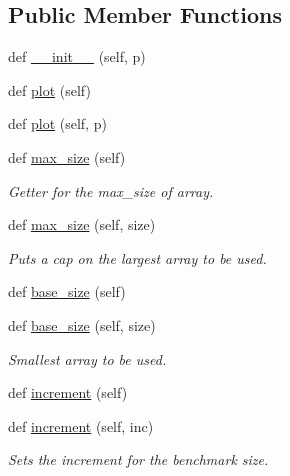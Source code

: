 \subsection*{Public Member Functions}
\begin{DoxyCompactItemize}
\item 
def \mbox{\hyperlink{classbridges_1_1sorting__benchmark_1_1_sorting_benchmark_a703f01c41d21cf5127eeff8918a4adbd}{\+\_\+\+\_\+init\+\_\+\+\_\+}} (self, p)
\item 
def \mbox{\hyperlink{classbridges_1_1sorting__benchmark_1_1_sorting_benchmark_a2cc8cc19c22027fc9b53d2fc13e47a0a}{plot}} (self)
\item 
def \mbox{\hyperlink{classbridges_1_1sorting__benchmark_1_1_sorting_benchmark_a39a40658212ca6ecb39870b6ec135e37}{plot}} (self, p)
\item 
def \mbox{\hyperlink{classbridges_1_1sorting__benchmark_1_1_sorting_benchmark_a14ce3cee6cd2a7233b894abb32cebc06}{max\+\_\+size}} (self)
\begin{DoxyCompactList}\small\item\em Getter for the max\+\_\+size of array. \end{DoxyCompactList}\item 
def \mbox{\hyperlink{classbridges_1_1sorting__benchmark_1_1_sorting_benchmark_ac315d63ef7b22cf5b4835663bd1cf809}{max\+\_\+size}} (self, size)
\begin{DoxyCompactList}\small\item\em Puts a cap on the largest array to be used. \end{DoxyCompactList}\item 
def \mbox{\hyperlink{classbridges_1_1sorting__benchmark_1_1_sorting_benchmark_a77d0f3d1afe635237de0353c372fadea}{base\+\_\+size}} (self)
\item 
def \mbox{\hyperlink{classbridges_1_1sorting__benchmark_1_1_sorting_benchmark_a14aeb9e7fe1b8ca6b9fabc83e68caa6b}{base\+\_\+size}} (self, size)
\begin{DoxyCompactList}\small\item\em Smallest array to be used. \end{DoxyCompactList}\item 
def \mbox{\hyperlink{classbridges_1_1sorting__benchmark_1_1_sorting_benchmark_a13b121b5fdecf989544638a94d6498d8}{increment}} (self)
\item 
def \mbox{\hyperlink{classbridges_1_1sorting__benchmark_1_1_sorting_benchmark_a3a2f43cd8fdb9f5ca88bd0ac9e6d0e2e}{increment}} (self, inc)
\begin{DoxyCompactList}\small\item\em Sets the increment for the benchmark size. \end{DoxyCompactList}\item 

\end{DoxyCompactItemize}
